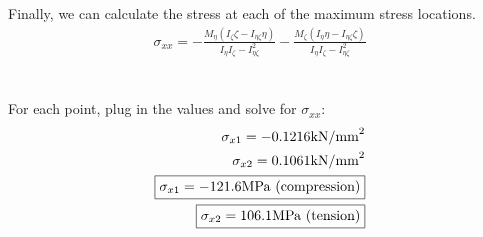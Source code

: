 \documentclass[12 pt]{article}
\begin{document}
Finally, we can calculate the stress at each of the maximum stress locations.
\begin{align*}
    \sigma_{xx}=-\frac{M_{\eta}(I_{\zeta}\zeta-I_{\eta \zeta}\eta)}{I_{\eta}I_{\zeta}-I_{\eta \zeta}^2}
    -\frac{M_{\zeta}(I_{\eta}\eta - I_{\eta \zeta}\zeta)}{I_{\eta}I_{\zeta}-I_{\eta \zeta}^2}
\end{align*} \\ \\
For each point, plug in the values and solve for $\sigma_{xx}$:
\begin{align*}
    \sigma_{x1}=-0.1216 \textrm{kN/mm}^2 \\
    \sigma_{x2}=0.1061 \textrm{kN/mm}^2 \\
    \fbox{$\sigma_{x1}=-121.6 \textrm{MPa (compression)}$} \\
    \fbox{$\sigma_{x2}=106.1 \textrm{MPa (tension)}$}
\end{align*}

\pagebreak
\end{document}
